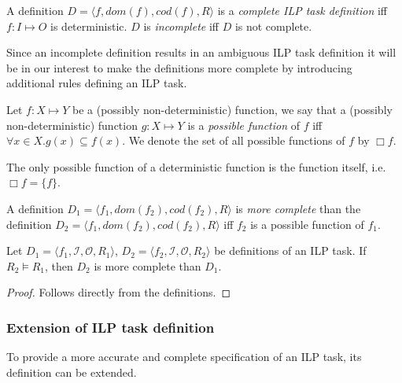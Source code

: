 \begin{defn}
A definition $D=\langle f, dom(f), cod(f), R \rangle$ is a \emph{complete ILP task definition} iff $f:I \mapsto O$ is deterministic. $D$ is \emph{incomplete} iff $D$ is not complete.
\end{defn}

Since an incomplete definition results in an ambiguous ILP task definition it will be in our interest to make the definitions more complete by introducing additional rules defining an ILP task.

\begin{defn}
Let $f:X \mapsto Y$ be a (possibly non-deterministic) function, we say that a (possibly non-deterministic) function $g:X \mapsto Y$ is a \emph{possible function} of $f$ iff
$\forall x \in X. g(x) \subseteq f(x)$. We denote the set of all possible functions of $f$ by $\Box f$.
\end{defn}

\begin{remark}
The only possible function of a deterministic function is the function itself, i.e. $\Box f = \{f\}$.
\end{remark}

\begin{defn}
A definition $D_1=\langle f_1, dom(f_2), cod(f_2), R \rangle$ is \emph{more complete} than the definition $D_2=\langle f_1, dom(f_2), cod(f_2), R \rangle$ iff
$f_2$ is a possible function of $f_1$.
\end{defn}

\begin{corollary}\label{corollary_more_complete_1}
Let $D_1=\langle f_1, \mathcal{I}, \mathcal{O}, R_1 \rangle$, $D_2=\langle f_2, \mathcal{I}, \mathcal{O}, R_2 \rangle$ be definitions of an ILP task.
If $R_2 \models R_1$, then $D_2$ is more complete than $D_1$.
\end{corollary}

\begin{proof}
Follows directly from the definitions.
\end{proof}

\subsubsection{Extension of ILP task definition}
To provide a more accurate and complete specification of an ILP task, its definition can be extended.

